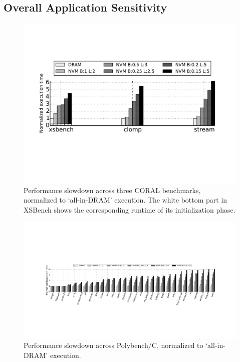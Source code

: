 \subsection{Overall Application Sensitivity}
\label{sec:sensitivity}

\begin{figure}[t]
\centering
\includegraphics[width=\columnwidth]{figures/coral_throttle.pdf}
\caption{Performance slowdown across three CORAL benchmarks, normalized to `all-in-DRAM' execution. The white bottom part in XSBench shows the corresponding runtime of its initialization phase.}
\label{fig:coral_throttle}
\vspace{-0.2in}
\end{figure}

\begin{figure}[t]
\centering
\includegraphics[width=\textwidth]{figures/polybench_throttle.pdf}
\caption{Performance slowdown across Polybench/C, normalized to `all-in-DRAM' execution.}
\label{fig:poly_throttle}
\end{figure}


